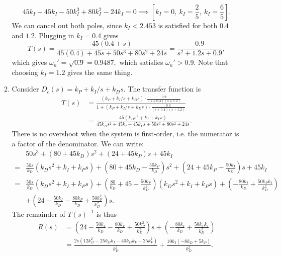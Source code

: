 \documentclass{article}
\numberwithin{equation}{section}
\begin{document}
\begin{enumerate}[label=\textbf{2.\arabic*}]
\begin{enumerate}[label=(\alph*)]
        \begin{equation}
            45k_I - 45k_I - 50k_I^3 + 80k_I^2 - 24k_I = 0 \implies [ k_{I} = 0, \  k_{I} = \frac{2}{5}, \  k_{I} = \frac{6}{5}].
        \end{equation}
        We can cancel out both poles, since $k_I < 2.453$ is satisfied for both $0.4$ and $1.2.$ Plugging in $k_I=0.4$ gives 
        \begin{equation}
            T(s) = \frac{45(0.4+s)}{45(0.4) + 45s + 50s^3 + 80s^2 + 24s} = \frac{0.9}{s^{2} + 1.2 s + 0.9},
        \end{equation}
        which gives $\omega_n' = \sqrt{0.9} = 0.9487,$ which satisfies $\omega_n' > 0.9.$ Note that choosing $k_I = 1.2$ gives the same thing.
        \item Consider $D_c(s) = k_P + k_I/s + k_Ds.$ The transfer function is
        \begin{align}
            T(s) &= \frac{(k_P + k_I/s + k_Ds) \cdot  \frac{0.9}{(s+0.4)(s+1.2)}}{1+(k_P + k_I/s + k_Ds) \cdot  \frac{0.9}{(s+0.4)(s+1.2)}} \\ 
            &= \frac{45 (k_{D} s^{2} + k_{I} + k_{P} s)}{45 k_{D} s^{2} + 45 k_{I} + 45 k_{P} s + 50 s^{3} + 80 s^{2} + 24 s}.
        \end{align}
        There is no overshoot when the system is first-order, i.e. the numerator is a factor of the denominator. We can write:
        \begin{align}
            &50s^3 + (80+45k_D)s^2 + (24+45k_P)s + 45k_I \\ 
            =& \frac{50s}{k_D}\left(k_{D} s^{2} + k_{I} + k_{P} s\right)   + \left(80+45k_D- \frac{50k_P}{k_D}\right)s^2 + \left(24+45k_P-\frac{50k_I}{k_D}\right)s + 45k_I \\
            =& \frac{50s}{k_D}\left(k_{D} s^{2} + k_{I} + k_{P} s\right)   + \left(\frac{80}{k_D}+45- \frac{50k_P}{k_D^2}\right)\left(k_{D} s^{2} + k_{I} + k_{P} s\right) + \left(- \frac{80k_I}{k_D} + \frac{50k_Pk_I}{k_D^2}\right) \\ 
            &+ \left(24-\frac{50k_I}{k_D}- \frac{80k_P}{k_D}+ \frac{50k_P^2}{k_D^2}\right)s.
        \end{align}
        The remainder of $T(s)^{-1}$ is thus 
        \begin{align}
            R(s) &= \left(24-\frac{50k_I}{k_D}- \frac{80k_P}{k_D}+ \frac{50k_P^2}{k_D^2}\right)s + \left(- \frac{80k_I}{k_D} + \frac{50k_Pk_I}{k_D^2}\right) \\ 
            &= \frac{2 s (12 k_{D}^{2} - 25 k_{D} k_{I} - 40 k_{D} k_{P} + 25 k_{P}^{2})}{k_{D}^{2}} + \frac{10 k_{I} (- 8 k_{D} + 5 k_{P})}{k_{D}^{2}}.

\end{align}
\end{enumerate}
\end{enumerate}
\end{document}
